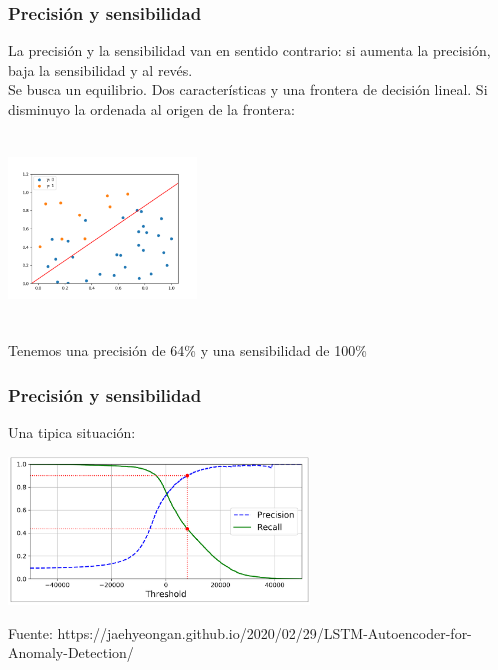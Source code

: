 \documentclass{beamer}
\begin{document}
\begin{frame}
   \frametitle{Precisión y sensibilidad}
   La precisión y la sensibilidad van en sentido contrario: si aumenta
   la precisión, baja la sensibilidad y al revés.\\
   Se busca un equilibrio.
   Dos características y una frontera de decisión lineal. {\footnotesize
     Si disminuyo
   la ordenada al origen de la frontera:}\\
   \begin{center}
     \includegraphics[height=5cm,width=5cm]{precision_recall_2.png}
   \end{center}
         Tenemos una precisión de 64\% y una sensibilidad de 100\%

   
 \end{frame}
\begin{frame}
   \frametitle{Precisión y sensibilidad}
   Una tipica situación: 
   \begin{center}
     \includegraphics[width=8cm]{precision-recall-curve.png}
   \end{center}
   {\tiny Fuente: https://jaehyeongan.github.io/2020/02/29/LSTM-Autoencoder-for-Anomaly-Detection/}

   
 \end{frame}
\end{document}
